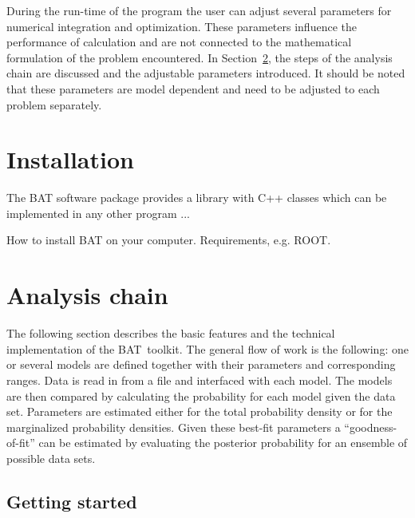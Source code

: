 \documentclass[11pt, a4paper]{article}
\newcommand{\BAT}{{\sc BAT}}
\begin{document}
\noindent 
During the run-time of the program the user can adjust several
parameters for numerical integration and optimization. These
parameters influence the performance of calculation and are not
connected to the mathematical formulation of the problem
encountered. In Section~\ref{section:analysis}, the steps of the
analysis chain are discussed and the adjustable parameters
introduced. It should be noted that these parameters are model
dependent and need to be adjusted to each problem separately. 


\section{Installation} 

The BAT software package provides a library with C++ classes which can
be implemented in any other program ...

How to install BAT on your computer. Requirements, e.g. ROOT.


\section{Analysis chain}
\label{section:analysis}

The following section describes the basic features and the technical
implementation of the \BAT\ toolkit. The general flow of work is the
following: one or several models are defined together with their
parameters and corresponding ranges. Data is read in from a file and
interfaced with each model. The models are then compared by
calculating the probability for each model given the data
set. Parameters are estimated either for the total probability density
or for the marginalized probability densities. Given these best-fit
parameters a ``goodness-of-fit'' can be estimated by evaluating the
posterior probability for an ensemble of possible data sets. 


\subsection{Getting started} 
\end{document}

